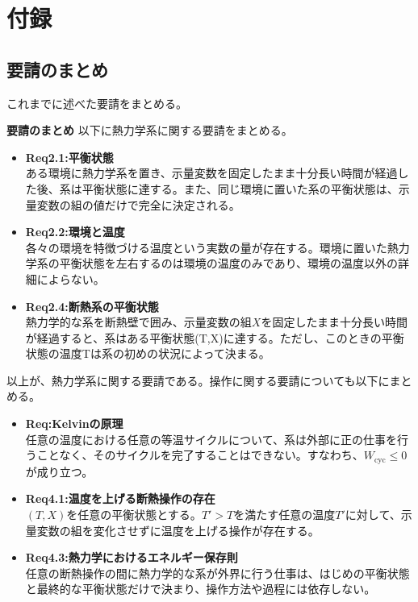 \documentclass[a4paper,11pt]{jsarticle}
\begin{document}
\section{付録}
\subsection{要請のまとめ}
これまでに述べた要請をまとめる。\\
\begin{itembox}[l]{\textbf{要請のまとめ}}
    以下に熱力学系に関する要請をまとめる。
    \begin{itemize}
        \item \textbf{Req2.1:平衡状態}\\
        ある環境に熱力学系を置き、示量変数を固定したまま十分長い時間が経過した後、系は平衡状態に達する。また、同じ環境に置いた系の平衡状態は、示量変数の組の値だけで完全に決定される。
        
        \item \textbf{Req2.2:環境と温度}\\
        各々の環境を特徴づける温度という実数の量が存在する。環境に置いた熱力学系の平衡状態を左右するのは環境の温度のみであり、環境の温度以外の詳細によらない。
        
        \item \textbf{Req2.4:断熱系の平衡状態}\\
        熱力学的な系を断熱壁で囲み、示量変数の組$X$を固定したまま十分長い時間が経過すると、系はある平衡状態(T,X)に達する。ただし、このときの平衡状態の温度Tは系の初めの状況によって決まる。
    \end{itemize}
    以上が、熱力学系に関する要請である。操作に関する要請についても以下にまとめる。
    \begin{itemize}
        \item \textbf{Req:Kelvinの原理}\\
        任意の温度における任意の等温サイクルについて、系は外部に正の仕事を行うことなく、そのサイクルを完了することはできない。すなわち、$W_{\text{cyc}} \leq 0$が成り立つ。
        
        \item \textbf{Req4.1:温度を上げる断熱操作の存在}\\
        $(T,X)$を任意の平衡状態とする。$T'>T$を満たす任意の温度$T'$に対して、示量変数の組を変化させずに温度を上げる操作が存在する。
        
        \item \textbf{Req4.3:熱力学におけるエネルギー保存則}\\
        任意の断熱操作の間に熱力学的な系が外界に行う仕事は、はじめの平衡状態と最終的な平衡状態だけで決まり、操作方法や過程には依存しない。
    \end{itemize}
\end{itembox}
\end{document}
